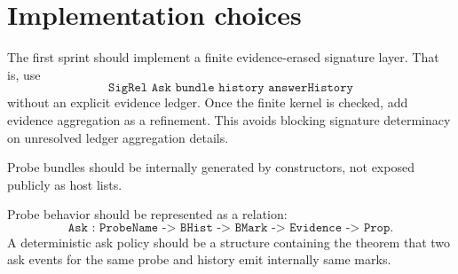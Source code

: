 \section{Implementation choices}

The first sprint should implement a finite evidence-erased signature layer.  That is, use
$$
\texttt{SigRel Ask bundle history answerHistory}
$$
without an explicit evidence ledger.  Once the finite kernel is checked, add evidence aggregation as a refinement.  This avoids blocking signature determinacy on unresolved ledger aggregation details.

Probe bundles should be internally generated by constructors, not exposed publicly as host lists.

Probe behavior should be represented as a relation:
$$
\texttt{Ask : ProbeName -> BHist -> BMark -> Evidence -> Prop}.
$$
A deterministic ask policy should be a structure containing the theorem that two ask events for the same probe and history emit internally same marks.
